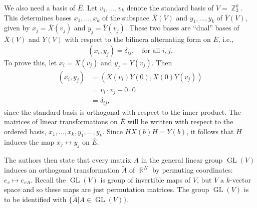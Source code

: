 \documentclass[a4paper]{article}
\DeclareMathOperator{\R}{\mathbb{R}}
\DeclareMathOperator{\Z}{\mathbb{Z}}
\DeclareMathOperator{\GL}{GL}
\begin{document}
  We also need a basis of $\overline{E}$. Let
  $v_1,\ldots,v_k$ denote the standard basis of $V =
  \Z_2^{k}$. This determines bases $x_1,\ldots,x_k$ of the
  subspace $\overline{X}(V)$ and $y_1,\ldots,y_k$ of
  $\overline{Y}(V)$, given by $x_j = \overline{X}(v_j)$  and
  $y_j = \overline{Y}(v_j)$. These two bases are ``dual''
  bases of $\overline{X}(V)$ and $\overline{Y}(V)$ with
  respect to the bilinera alternating form on
  $\overline{E}$, i.e.,
  \[
    (x_i, y_j) = \delta_{ij},
    \quad
    \text{for all } i, j.
  \] 
  To prove this, let $x_i = \overline{X}(v_j)$ and $y_j =
  \overline{Y}(v_j)$. Then
  \begin{align}
    \left( x_i, y_j \right) 
    &= \left( 
      \overline{X}(v_i)\overline{Y}(0),
      \overline{X}(0)\overline{Y}(v_j)
    \right)  \\
    &= v_i \cdot v_j - 0 \cdot 0 \\
    &= \delta_{ij},
  \end{align}
  since the standard basis is orthogonal with respect to the
  inner product. The matrices of linear transformations on
  $\overline{E}$ will be written with respect to the ordered
  basis, $x_1,\ldots,x_k,y_1,\ldots,y_k$. Since $HX(b)H =
  Y(b)$, it follows that $H$ induces the map $x_j
  \leftrightarrow y_j$ on $\overline{E}$.

  The authors then state that every matrix $A$ in the
  general linear group $\GL(V)$ induces an orthogonal
  transformation $\tilde A$ of $\R^{N}$ by permuting
  coordinates: $e_v \mapsto e_{vA}$. Recall the $\GL(V)$ is
  group of invertible maps of $V$, but $V$ a $k$-vector
  space and so these maps are just permutation matrices. The
  group $\GL(V)$ is to be identified with $\{\tilde A | A
  \in \GL(V)\}$.
\end{document}
